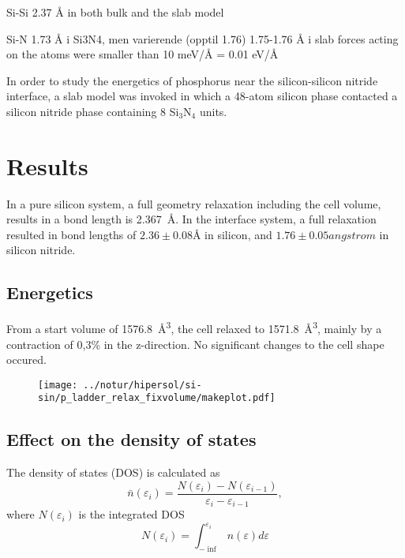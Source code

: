 \documentclass[11pt,bibliography=totoc,index=totoc]{scrbook}   %
\begin{document}
Si-Si 2.37 Å in both bulk and the slab model

Si-N 1.73 Å i Si3N4, men varierende (opptil 1.76)
1.75-1.76 Å i slab
forces acting on the atoms were smaller than 10 meV/Å = 0.01 eV/Å


In order to study the energetics of phosphorus near the silicon-silicon nitride interface,
a slab model was invoked in which a 48-atom silicon phase contacted a silicon nitride phase containing 
8 Si$_3$N$_4$ units.


\section{Results}

In a pure silicon system, a full geometry relaxation including the cell volume, results in a bond length is \SI{2.367}{\angstrom}. %
In the interface system, a full relaxation resulted in bond lengths of $2.36\pm0.08\si{\angstrom}$ in silicon, and $1.76\pm 0.05\si{angstrom}$ in silicon nitride.


\subsection{Energetics}

From a start volume of \SI{1576.8}{\angstrom\cubed}, the cell relaxed to \SI{1571.8}{\angstrom\cubed}, mainly by a contraction of 0,3\% in the z-direction. No significant changes to the cell shape occured.

\begin{figure}[htp]
  \centering
  \texttt{[image: ../notur/hipersol/si-sin/p\_ladder\_relax\_fixvolume/makeplot.pdf]}
  \caption{}
  \label{fig:nome}
\end{figure}


\subsection{Effect on the density of states}

The density of states (DOS) is calculated as
\begin{equation}
    \bar{n}(\varepsilon_i) = \frac{N(\varepsilon_i) - N(\varepsilon_{i-1})}{\varepsilon_i - \varepsilon_{i-1}},
\end{equation}
where $N(\varepsilon_i)$ is the integrated DOS
\begin{equation}
    N(\varepsilon_i) = \int_{-\inf}^{\varepsilon_i} n(\varepsilon) d\varepsilon
\end{equation}
\end{document}
